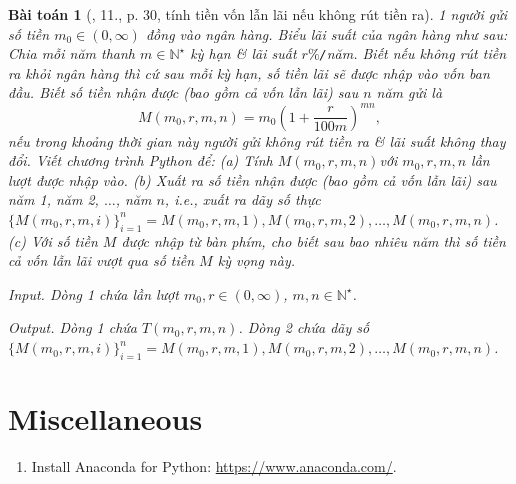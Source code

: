 \documentclass{article}
\newtheorem{baitoan}{Bài toán}
\begin{document}
\begin{baitoan}[\cite{CDHT_Toan_10_CD}, 11., p. 30, tính tiền vốn lẫn lãi nếu không rút tiền ra]
	1 người gửi số tiền $m_0\in(0,\infty)$ đồng vào ngân hàng. Biểu lãi suất của ngân hàng như sau: Chia mỗi năm thanh $m\in\mathbb{N}^\star$ kỳ hạn \& lãi suất $r\%${\tt/}năm. Biết nếu không rút tiền ra khỏi ngân hàng thì cứ sau mỗi kỳ hạn, số tiền lãi sẽ được nhập vào vốn ban đầu. Biết số tiền nhận được (bao gồm cả vốn lẫn lãi) sau $n$ năm gửi là
	\begin{equation*}
		M(m_0,r,m,n) = m_0\left(1 + \frac{r}{100m}\right)^{mn},
	\end{equation*}
	nếu trong khoảng thời gian này người gửi không rút tiền ra \& lãi suất không thay đổi. Viết chương trình Python để: (a) Tính $M(m_0,r,m,n)$với $m_0,r,m,n$ lần lượt được nhập vào. (b) Xuất ra số tiền nhận được (bao gồm cả vốn lẫn lãi) sau năm 1, năm 2, $\ldots$, năm $n$, i.e., xuất ra dãy số thực $\{M(m_0,r,m,i)\}_{i=1}^n = M(m_0,r,m,1),M(m_0,r,m,2),\ldots,M(m_0,r,m,n)$. (c) Với số tiền $M$ được nhập từ bàn phím, cho biết sau bao nhiêu năm thì số tiền cả vốn lẫn lãi vượt qua số tiền $M$ kỳ vọng này.
	\item {\sf Input.} Dòng 1 chứa lần lượt $m_0,r\in(0,\infty)$, $m,n\in\mathbb{N}^\star$.
	\item {\sf Output.} Dòng 1 chứa $T(m_0,r,m,n)$. Dòng 2 chứa dãy số $\{M(m_0,r,m,i)\}_{i=1}^n = M(m_0,r,m,1),M(m_0,r,m,2),\ldots,M(m_0,r,m,n)$.
\end{baitoan}


\section{Miscellaneous}

\begin{enumerate}
	\item Install Anaconda for Python: \url{https://www.anaconda.com/}.
\end{enumerate}


\printbibliography[heading=bibintoc]
	
\end{document}
